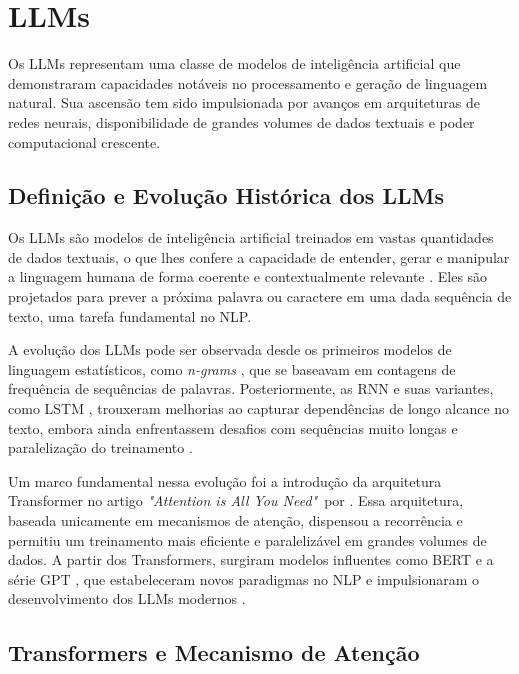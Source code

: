 \section{\texorpdfstring{\gls{LLM}s}{LLMs}}
\label{sec:llms}

Os \gls{LLM}s representam uma classe de modelos de inteligência artificial que
demonstraram capacidades notáveis no processamento e geração de linguagem
natural. Sua ascensão tem sido impulsionada por avanços em arquiteturas de redes
neurais, disponibilidade de grandes volumes de dados textuais e poder
computacional crescente.

\subsection{Definição e Evolução Histórica dos \texorpdfstring{\gls{LLM}s}{LLMs}}
\label{subsec:definicao_evolucao_llms}

Os \gls{LLM}s são modelos de inteligência artificial treinados em vastas
quantidades de dados textuais, o que lhes confere a capacidade de entender,
gerar e manipular a linguagem humana de forma coerente e contextualmente
relevante \cite{hadi2023survey}. Eles são projetados para prever a próxima
palavra ou caractere em uma dada sequência de texto, uma tarefa fundamental no
\gls{NLP}.

A evolução dos \gls{LLM}s pode ser observada desde os primeiros modelos de linguagem
estatísticos, como \textit{n-grams} \cite{brown1992class}, que se baseavam em contagens
de frequência de sequências de palavras. Posteriormente, as \gls{RNN} e suas
variantes, como \gls{LSTM} \cite{hochreiter1997long}, trouxeram melhorias ao
capturar dependências de longo alcance no texto, embora ainda enfrentassem
desafios com sequências muito longas e paralelização do treinamento
\cite{hadi2023survey}.

Um marco fundamental nessa evolução foi a introdução da arquitetura Transformer
no artigo \textit{"Attention is All You Need"}\ por .
Essa arquitetura, baseada unicamente em mecanismos de atenção, dispensou a
recorrência e permitiu um treinamento mais eficiente e paralelizável em grandes
volumes de dados. A partir dos Transformers, surgiram modelos influentes como
\gls{BERT} \cite{devlin2019bert} e a série \gls{GPT}
\cite{radford2018improving}, que estabeleceram novos paradigmas no \gls{NLP} e
impulsionaram o desenvolvimento dos \gls{LLM}s modernos \cite{hadi2023survey}.

\subsection{Transformers e Mecanismo de Atenção}
\label{subsec:arquitetura_transformers_atencao}

